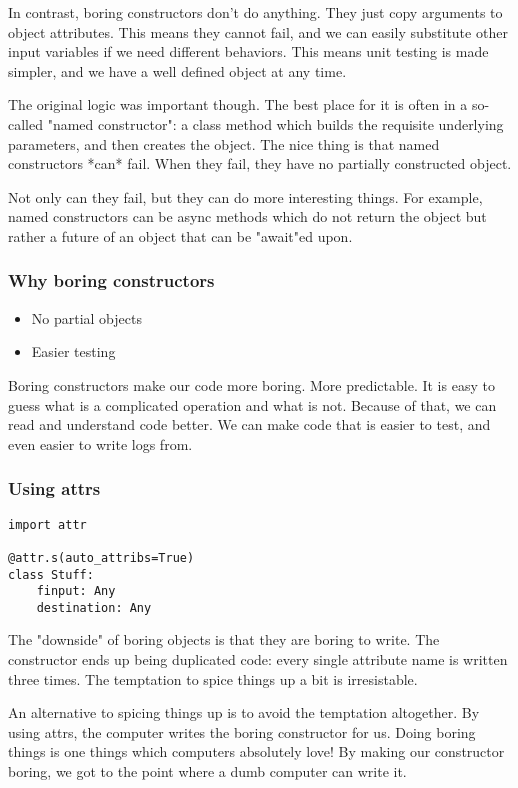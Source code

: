 In contrast,
boring constructors don't do anything.
They just copy arguments to object attributes.
This means they cannot fail,
and we can easily substitute other input variables if we need
different behaviors.
This means unit testing is made simpler,
and we have a well defined object at any time.

The original logic was important though.
The best place for it is often in a so-called
"named constructor":
a class method which builds the requisite underlying parameters,
and then creates the object.
The nice thing is that named constructors
*can*
fail.
When they fail,
they have no partially constructed object.

Not only can they fail,
but they can do more interesting things.
For example,
named constructors can be async methods
which do not return the object
but rather a future of an object
that can be "await"ed upon.


\begin{frame}[fragile]
\frametitle{Why boring constructors}

\begin{itemize}
\item No partial objects
\item Easier testing
\end{itemize}

\end{frame}

Boring constructors make our code more boring.
More predictable.
It is easy to guess what is a complicated operation
and what is not.
Because of that,
we can read and understand code better.
We can make code that is easier to test,
and even easier to write logs from.

\begin{frame}[fragile]
\frametitle{Using attrs}

\begin{lstlisting}
import attr

@attr.s(auto_attribs=True)
class Stuff:
    finput: Any
    destination: Any
\end{lstlisting}

\end{frame}

The "downside" of boring objects is that they
are boring to write.
The constructor ends up being duplicated code:
every single attribute name is written three times.
The temptation to spice things up a bit is irresistable.

An alternative to spicing things up
is to avoid the temptation altogether.
By using attrs,
the computer writes the boring constructor for us.
Doing boring things is one things which computers absolutely love!
By making our constructor boring,
we got to the point where a dumb computer can write it.

